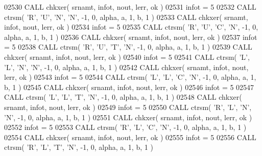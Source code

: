 \begin{DoxyCode}
02530       \textcolor{keyword}{CALL }chkxer( srnamt, infot, nout, lerr, ok )
02531       infot = 5
02532       \textcolor{keyword}{CALL }ctrsm( \textcolor{stringliteral}{'R'}, \textcolor{stringliteral}{'U'}, \textcolor{stringliteral}{'N'}, \textcolor{stringliteral}{'N'}, -1, 0, alpha, a, 1, b, 1 )
02533       \textcolor{keyword}{CALL }chkxer( srnamt, infot, nout, lerr, ok )
02534       infot = 5
02535       \textcolor{keyword}{CALL }ctrsm( \textcolor{stringliteral}{'R'}, \textcolor{stringliteral}{'U'}, \textcolor{stringliteral}{'C'}, \textcolor{stringliteral}{'N'}, -1, 0, alpha, a, 1, b, 1 )
02536       \textcolor{keyword}{CALL }chkxer( srnamt, infot, nout, lerr, ok )
02537       infot = 5
02538       \textcolor{keyword}{CALL }ctrsm( \textcolor{stringliteral}{'R'}, \textcolor{stringliteral}{'U'}, \textcolor{stringliteral}{'T'}, \textcolor{stringliteral}{'N'}, -1, 0, alpha, a, 1, b, 1 )
02539       \textcolor{keyword}{CALL }chkxer( srnamt, infot, nout, lerr, ok )
02540       infot = 5
02541       \textcolor{keyword}{CALL }ctrsm( \textcolor{stringliteral}{'L'}, \textcolor{stringliteral}{'L'}, \textcolor{stringliteral}{'N'}, \textcolor{stringliteral}{'N'}, -1, 0, alpha, a, 1, b, 1 )
02542       \textcolor{keyword}{CALL }chkxer( srnamt, infot, nout, lerr, ok )
02543       infot = 5
02544       \textcolor{keyword}{CALL }ctrsm( \textcolor{stringliteral}{'L'}, \textcolor{stringliteral}{'L'}, \textcolor{stringliteral}{'C'}, \textcolor{stringliteral}{'N'}, -1, 0, alpha, a, 1, b, 1 )
02545       \textcolor{keyword}{CALL }chkxer( srnamt, infot, nout, lerr, ok )
02546       infot = 5
02547       \textcolor{keyword}{CALL }ctrsm( \textcolor{stringliteral}{'L'}, \textcolor{stringliteral}{'L'}, \textcolor{stringliteral}{'T'}, \textcolor{stringliteral}{'N'}, -1, 0, alpha, a, 1, b, 1 )
02548       \textcolor{keyword}{CALL }chkxer( srnamt, infot, nout, lerr, ok )
02549       infot = 5
02550       \textcolor{keyword}{CALL }ctrsm( \textcolor{stringliteral}{'R'}, \textcolor{stringliteral}{'L'}, \textcolor{stringliteral}{'N'}, \textcolor{stringliteral}{'N'}, -1, 0, alpha, a, 1, b, 1 )
02551       \textcolor{keyword}{CALL }chkxer( srnamt, infot, nout, lerr, ok )
02552       infot = 5
02553       \textcolor{keyword}{CALL }ctrsm( \textcolor{stringliteral}{'R'}, \textcolor{stringliteral}{'L'}, \textcolor{stringliteral}{'C'}, \textcolor{stringliteral}{'N'}, -1, 0, alpha, a, 1, b, 1 )
02554       \textcolor{keyword}{CALL }chkxer( srnamt, infot, nout, lerr, ok )
02555       infot = 5
02556       \textcolor{keyword}{CALL }ctrsm( \textcolor{stringliteral}{'R'}, \textcolor{stringliteral}{'L'}, \textcolor{stringliteral}{'T'}, \textcolor{stringliteral}{'N'}, -1, 0, alpha, a, 1, b, 1 )

\end{DoxyCode}

